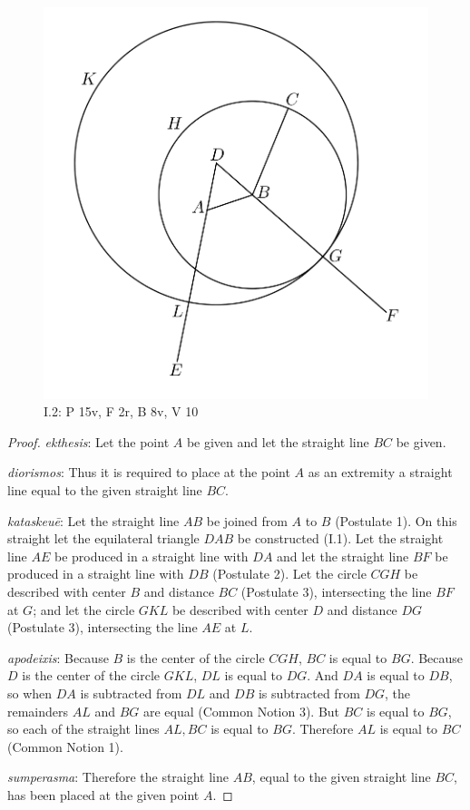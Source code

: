 \documentclass{article}
\begin{document}
\begin{figure}
\begin{center}
\includegraphics[width=\textwidth]{I2.png}
\end{center}
\caption{I.2: P 15v, F 2r, B 8v, V 10}
\label{I2}
\end{figure}

\begin{proof}
{\em ekthesis}: Let the point $A$ be given and let  the straight line $BC$ be given.

{\em diorismos}: Thus it is required to place at the point $A$ as an extremity 
a straight line equal to the given straight line $BC$.

{\em kataskeu\={e}}: Let the  straight line $AB$ be joined from $A$ to $B$ (Postulate 1).
On this straight let the equilateral triangle $DAB$ be constructed (I.1).
Let the straight line $AE$ be produced in a straight line with $DA$ and let the straight line
$BF$ be produced in a straight line with $DB$ (Postulate 2).
Let the circle $CGH$ be described with center $B$ and distance $BC$ (Postulate 3), intersecting the line
$BF$ at $G$; and
let the circle $GKL$ be described with center $D$ and distance $DG$ (Postulate 3), intersecting the line
$AE$ at $L$.

{\em apodeixis}: Because $B$ is the center of the circle $CGH$, $BC$ is equal to $BG$.
Because $D$ is the center of the circle $GKL$, $DL$ is equal to $DG$.
And $DA$ is equal to $DB$, so when $DA$ is subtracted from $DL$ and 
$DB$ is subtracted from $DG$, the remainders $AL$ and $BG$ are equal (Common Notion 3).
But $BC$ is equal to $BG$, so each of the straight lines $AL,BC$ is equal to $BG$.
Therefore $AL$ is equal to $BC$ (Common Notion 1).

{\em sumperasma}: Therefore the straight line $AB$, equal to the given straight line $BC$,
has been placed at the given point $A$.
\end{proof}
\end{document}
